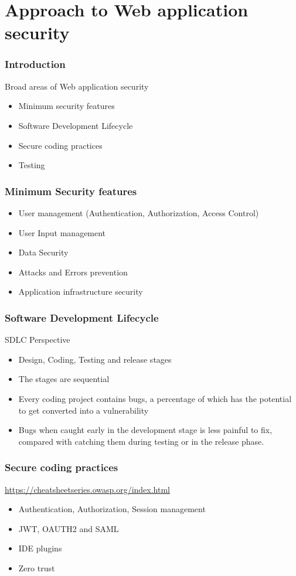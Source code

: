 \documentclass[13pt, aspectratio=169]{beamer}
\begin{document}
\section{Approach to Web application security}

\begin{frame}
\frametitle{Introduction}
Broad areas of Web application security 
\begin{itemize}
	\item Minimum security features
	\item Software Development Lifecycle
	\item Secure coding practices
	\item Testing
\end{itemize}


\end{frame}

\begin{frame}
	\frametitle{Minimum Security features}
	
	\begin{itemize}
		\item User management (Authentication, Authorization, Access Control)
		\item User Input management
		\item Data Security
		\item Attacks and Errors prevention
		\item Application infrastructure security
	\end{itemize}
	
	
\end{frame}


\begin{frame}
	\frametitle{Software Development Lifecycle}
SDLC Perspective
	\begin{itemize}
		\item Design, Coding, Testing and release stages
		\item The stages are sequential
		\item Every coding project contains bugs, a percentage of which has the potential to get converted into a vulnerability
		\item Bugs when caught early in the development stage is less painful to fix, compared with catching them during testing or in the release phase.
	\end{itemize}
	
	
\end{frame}

\begin{frame}
	\frametitle{Secure coding practices}
\url{https://cheatsheetseries.owasp.org/index.html}
	\begin{itemize}
		\item Authentication, Authorization, Session management
		\item JWT, OAUTH2 and SAML
		\item IDE plugins
		\item Zero trust
	\end{itemize}
\end{frame}
\end{document}
